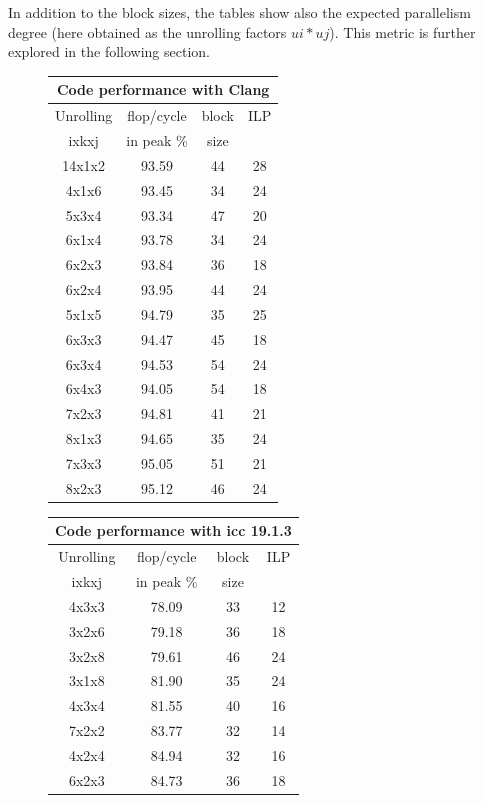 \documentclass{article}
\begin{document}
In addition to the block sizes, the tables show also the expected parallelism degree (here obtained as the unrolling factors $ui*uj$). This metric is further explored in the following section.

\begin{figure}[h!]
{    \scriptsize
    \begin{tabular}{|c|c|c|c|}
      \hline
      \multicolumn{4}{|c|}{Code performance with Clang} \\
      \hline
      Unrolling & flop/cycle & block  & ILP\\
      ixkxj& in peak \% & size & \\
      \hline
14x1x2 & 93.59 & 44 & 28 \\
4x1x6 & 93.45 & 34 & 24 \\
5x3x4 & 93.34 & 47 & 20 \\
6x1x4 & 93.78 & 34 & 24 \\
6x2x3 & 93.84 & 36 & 18 \\
6x2x4 & 93.95 & 44 & 24 \\
5x1x5 & 94.79 & 35 & 25 \\
6x3x3 & 94.47 & 45 & 18 \\
6x3x4 & 94.53 & 54 & 24 \\
6x4x3 & 94.05 & 54 & 18 \\
7x2x3 & 94.81 & 41 & 21 \\
8x1x3 & 94.65 & 35 & 24 \\
7x3x3 & 95.05 & 51 & 21 \\
8x2x3 & 95.12 & 46 & 24 \\
\hline
\end{tabular}
    \begin{tabular}{|c|c|c|c|}
      \hline
      \multicolumn{4}{|c|}{Code performance with icc 19.1.3} \\
      \hline
      Unrolling & flop/cycle & block  & ILP\\
      ixkxj& in peak \% & size & \\
      \hline
4x3x3 & 78.09 & 33 & 12 \\
3x2x6 & 79.18 & 36 & 18 \\
3x2x8 & 79.61 & 46 & 24 \\
3x1x8 & 81.90 & 35 & 24 \\
4x3x4 & 81.55 & 40 & 16 \\
7x2x2 & 83.77 & 32 & 14 \\
4x2x4 & 84.94 & 32 & 16 \\
6x2x3 & 84.73 & 36 & 18 \\

\end{tabular}}
\end{figure}
\end{document}
